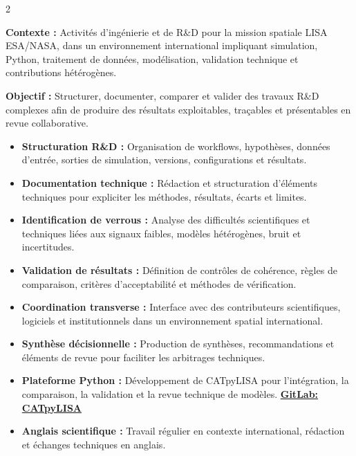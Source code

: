 \documentclass[8pt,a4paper,ragged2e,withhyper]{altacv}
\begin{document}
\begin{paracol}{2}
\divider


\textbf{Contexte :} Activités d’ingénierie et de R\&D pour la mission spatiale LISA ESA/NASA, dans un environnement international impliquant simulation, Python, traitement de données, modélisation, validation technique et contributions hétérogènes.

\textbf{Objectif :} Structurer, documenter, comparer et valider des travaux R\&D complexes afin de produire des résultats exploitables, traçables et présentables en revue collaborative.

\begin{itemize}
  \item \textbf{Structuration R\&D :} Organisation de workflows, hypothèses, données d’entrée, sorties de simulation, versions, configurations et résultats.
  \item \textbf{Documentation technique :} Rédaction et structuration d’éléments techniques pour expliciter les méthodes, résultats, écarts et limites.
  \item \textbf{Identification de verrous :} Analyse des difficultés scientifiques et techniques liées aux signaux faibles, modèles hétérogènes, bruit et incertitudes.
  \item \textbf{Validation de résultats :} Définition de contrôles de cohérence, règles de comparaison, critères d’acceptabilité et méthodes de vérification.
  \item \textbf{Coordination transverse :} Interface avec des contributeurs scientifiques, logiciels et institutionnels dans un environnement spatial international.
  \item \textbf{Synthèse décisionnelle :} Production de synthèses, recommandations et éléments de revue pour faciliter les arbitrages techniques.
  \item \textbf{Plateforme Python :} Développement de CATpyLISA pour l’intégration, la comparaison, la validation et la revue technique de modèles.
  \textcolor{DarkPastelRed}{\href{https://gitlab.oca.eu/gboileau/lisa_l3_tools}{\bf GitLab: CATpyLISA}}
  \item \textbf{Anglais scientifique :} Travail régulier en contexte international, rédaction et échanges techniques en anglais.
\end{itemize}

\divider



\end{paracol}
\end{document}
